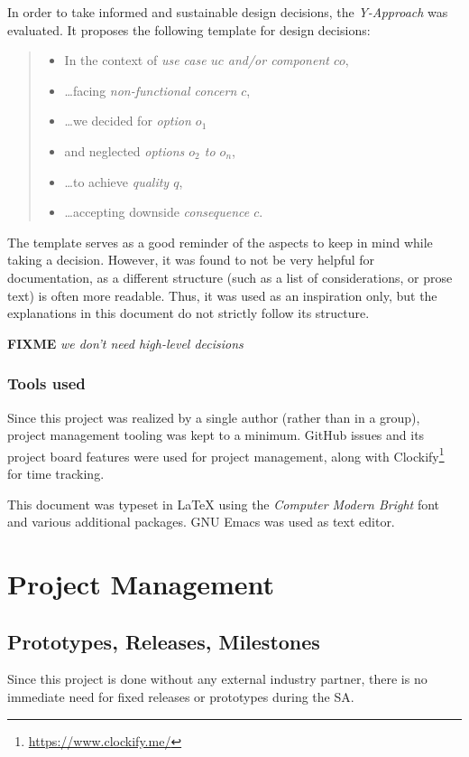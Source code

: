 \documentclass[a4paper,parskip=full]{scrreprt}
\newcommand{\fixme}[1]{\textbf{FIXME} \emph{#1}}
\begin{document}
In order to take informed and sustainable design decisions, the
\emph{Y-Approach} \autocite{yapproach} was evaluated. It proposes the following
template for design decisions:

\begin{quote}
  \begin{itemize}
    \item In the context of \emph{use case $uc$ and/or component $co$},
    \item \ldots facing \emph{non-functional concern $c$},
    \item \ldots we decided for \emph{option $o_1$}
    \item and neglected \emph{options $o_2$ to $o_n$},
    \item \ldots to achieve \emph{quality $q$},
    \item \ldots accepting downside \emph{consequence $c$}.
  \end{itemize}
\end{quote}

The template serves as a good reminder of the aspects to keep in mind
while taking a decision. However, it was found to not be very helpful for
documentation, as a different structure (such as a list of considerations, or
prose text) is often more readable. Thus, it was used as an inspiration only,
but the explanations in this document do not strictly follow its structure.

\fixme{we don't need high-level decisions}

\subsection{Tools used}
Since this project was realized by a single author (rather than in a group),
project management tooling was kept to a minimum. GitHub issues and its project
board features were used for project management, along with
Clockify\footnote{\url{https://www.clockify.me/}} for time tracking.

This document was typeset in \LaTeX{} using the \emph{Computer Modern Bright}
font and various additional packages. GNU Emacs was used as text editor.

\chapter{Project Management}
\label{ch:projectman}

\section{Prototypes, Releases, Milestones}
Since this project is done without any external industry partner, there is no
immediate need for fixed releases or prototypes during the SA.
\end{document}
